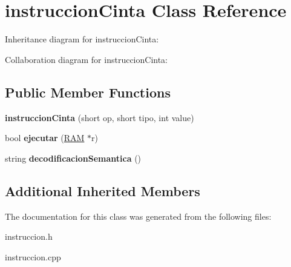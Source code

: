 \hypertarget{classinstruccionCinta}{}\section{instruccion\+Cinta Class Reference}
\label{classinstruccionCinta}


Inheritance diagram for instruccion\+Cinta\+:


Collaboration diagram for instruccion\+Cinta\+:
\subsection*{Public Member Functions}
\begin{DoxyCompactItemize}
\item 
\hypertarget{classinstruccionCinta_aaea8736dd054f7d69b004e9560703c98}{}{\bfseries instruccion\+Cinta} (short op, short tipo, int value)\label{classinstruccionCinta_aaea8736dd054f7d69b004e9560703c98}

\item 
\hypertarget{classinstruccionCinta_a6dc078a399eff4bb36b4ae298837041b}{}bool {\bfseries ejecutar} (\hyperlink{classRAM}{R\+A\+M} $\ast$r)\label{classinstruccionCinta_a6dc078a399eff4bb36b4ae298837041b}

\item 
\hypertarget{classinstruccionCinta_af9e54a58bb954c4136cacb4562296525}{}string {\bfseries decodificacion\+Semantica} ()\label{classinstruccionCinta_af9e54a58bb954c4136cacb4562296525}

\end{DoxyCompactItemize}
\subsection*{Additional Inherited Members}


The documentation for this class was generated from the following files\+:\begin{DoxyCompactItemize}
\item 
instruccion.\+h\item 
instruccion.\+cpp\end{DoxyCompactItemize}
